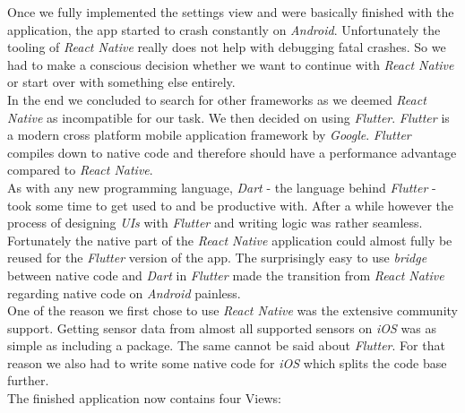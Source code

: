 Once we fully implemented the settings view and were basically finished with the application, the app started to crash constantly on \textit{Android}. Unfortunately the tooling of \textit{React Native} really does not help with debugging fatal crashes. So we had to make a conscious decision whether we want to continue with \textit{React Native} or start over with something else entirely. \\
In the end we concluded to search for other frameworks as we deemed \textit{React Native} as incompatible for our task. We then decided on using \textit{Flutter}. \textit{Flutter} is a modern cross platform mobile application framework by \textit{Google}. \textit{Flutter} compiles down to native code and therefore should have a performance advantage compared to \textit{React Native}. \\
As with any new programming language, \textit{Dart} - the language behind \textit{Flutter} - took some time to get used to and be productive with. After a while however the process of designing \textit{UIs} with \textit{Flutter} and writing logic was rather seamless. Fortunately the native part of the \textit{React Native} application could almost fully be reused for the \textit{Flutter} version of the app. The surprisingly easy to use \textit{bridge} between native code and \textit{Dart} in \textit{Flutter} made the transition from \textit{React Native} regarding native code on \textit{Android} painless. \\
One of the reason we first chose to use \textit{React Native} was the extensive community support. Getting sensor data from almost all supported sensors on \textit{iOS} was as simple as including a package. The same cannot be said about \textit{Flutter}. For that reason we also had to write some native code for \textit{iOS} which splits the code base further. \\

The finished application now contains four Views:

